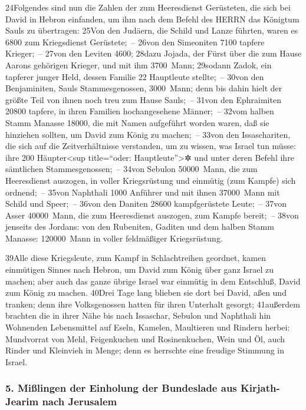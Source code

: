 24Folgendes sind nun die Zahlen der zum Heeresdienst Gerüsteten, die
sich bei David in Hebron einfanden, um ihm nach dem Befehl des HERRN das
Königtum Sauls zu übertragen: 25Von den Judäern, die Schild und Lanze
führten, waren es 6800 zum Kriegsdienst Gerüstete;~-- 26von den
Simeoniten 7100 tapfere Krieger;~-- 27von den Leviten 4600; 28dazu
Jojada, der Fürst über die zum Hause Aarons gehörigen Krieger, und mit
ihm 3700~Mann; 29sodann Zadok, ein tapferer junger Held, dessen Familie
22 Hauptleute stellte;~-- 30von den Benjaminiten, Sauls Stammesgenossen,
3000~Mann; denn bis dahin hielt der größte Teil von ihnen noch treu zum
Hause Sauls;~-- 31von den Ephraimiten 20800 tapfere, in ihren Familien
hochangesehene Männer;~-- 32vom halben Stamm Manasse 18000, die mit
Namen aufgeführt worden waren, daß sie hinziehen sollten, um David zum
König zu machen;~-- 33von den Issaschariten, die sich auf die
Zeitverhältnisse verstanden, um zu wissen, was Israel tun müsse: ihre
200 Häupter\textless sup title=``oder: Hauptleute''\textgreater✲ und
unter deren Befehl ihre sämtlichen Stammesgenossen;~-- 34von Sebulon
50000~Mann, die zum Heeresdienst auszogen, in voller Kriegsrüstung und
einmütig (zum Kampfe) sich ordnend;~-- 35von Naphthali 1000 Anführer und
mit ihnen 37000~Mann mit Schild und Speer;~-- 36von den Daniten 28600
kampfgerüstete Leute;~-- 37von Asser 40000~Mann, die zum Heeresdienst
auszogen, zum Kampfe bereit;~-- 38von jenseits des Jordans: von den
Rubeniten, Gaditen und dem halben Stamm Manasse: 120000~Mann in voller
feldmäßiger Kriegsrüstung.

39Alle diese Kriegsleute, zum Kampf in Schlachtreihen geordnet, kamen
einmütigen Sinnes nach Hebron, um David zum König über ganz Israel zu
machen; aber auch das ganze übrige Israel war einmütig in dem Entschluß,
David zum König zu machen. 40Drei Tage lang blieben sie dort bei David,
aßen und tranken; denn ihre Volksgenossen hatten für ihren Unterhalt
gesorgt; 41außerdem brachten die in ihrer Nähe bis nach Issaschar,
Sebulon und Naphthali hin Wohnenden Lebensmittel auf Eseln, Kamelen,
Maultieren und Rindern herbei: Mundvorrat von Mehl, Feigenkuchen und
Rosinenkuchen, Wein und Öl, auch Rinder und Kleinvieh in Menge; denn es
herrschte eine freudige Stimmung in Israel.

\hypertarget{miuxdflingen-der-einholung-der-bundeslade-aus-kirjath-jearim-nach-jerusalem}{%
\subsubsection{5. Mißlingen der Einholung der Bundeslade aus
Kirjath-Jearim nach
Jerusalem}\label{miuxdflingen-der-einholung-der-bundeslade-aus-kirjath-jearim-nach-jerusalem}}

